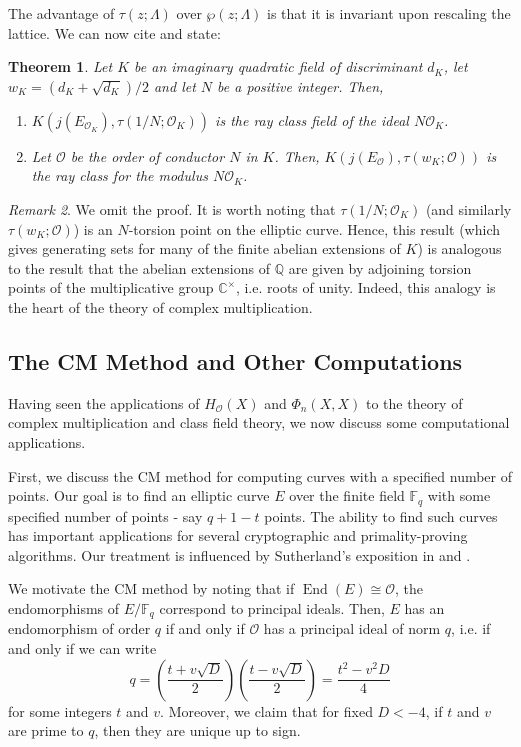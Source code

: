 \documentclass{amsart}
\newtheorem{thm}{Theorem}[section]
\theoremstyle{definition}
\theoremstyle{remark}
\newtheorem{remark}[thm]{Remark}
\numberwithin{equation}{section}
\newcommand{\cO}{\mathcal O}
\newcommand{\bbC}{\mathbb C}
\newcommand{\bbF}{\mathbb F}
\newcommand{\bbQ}{\mathbb Q}
\DeclareMathOperator{\End}{End}
\begin{document}
 The advantage of $\tau(z; \Lambda)$ over $\wp(z; \Lambda)$ is that it is invariant upon rescaling the lattice. We can now cite \cite{CoxPrimes} and state:
 
 \begin{thm} \label{thm:SecondMainTheoremOfComplexMult}
Let $K$ be an imaginary quadratic field of discriminant $d_{K}$, let $w_{K} = (d_{K} + \sqrt{d_{K}})/2$ and let $N$ be a positive integer. Then, 
\begin{enumerate}
\item $K(j(E_{\cO_{K}}), \tau(1/N; \cO_{K}))$ is the ray class field of the ideal $N \cO_{K}$.
\item Let $\cO$ be the order of conductor $N$ in $K$. Then, $K(j(E_{\cO}), \tau(w_{K};\cO))$ is the ray class for the modulus $N \cO_{K}$.
\end{enumerate}
 \end{thm}
 
 \begin{remark}
 We omit the proof. It is worth noting that $\tau(1/N;\cO_{K})$ (and similarly $\tau(w_{K};\cO)$) is an $N$-torsion point on the elliptic curve. Hence, this result (which gives generating sets for many of the finite abelian extensions of $K$) is analogous to the result that the abelian extensions of $\bbQ$ are given by adjoining torsion points of the multiplicative group $\bbC^{\times}$, i.e. roots of unity. Indeed, this analogy is the heart of the theory of complex multiplication.
 \end{remark}

\subsection{The CM Method and Other Computations} \label{subsec:CMMethod}

 Having seen the applications of $H_{\cO}(X)$ and $\Phi_{n}(X,X)$ to the theory of complex multiplication and class field theory, we now discuss some computational applications.

 First, we discuss the CM method for computing curves with a specified number of points. Our goal is to find an elliptic curve $E$ over the finite field $\bbF_{q}$ with some specified number of points - say $q + 1 - t$ points. The ability to find such curves has important applications for several cryptographic and primality-proving algorithms. Our treatment is influenced by Sutherland's exposition in \cite{SutherlandLN} and \cite{SutherlandIV}.
 
 We motivate the CM method by noting that if $\End(E) \cong \cO$, the endomorphisms of $E/\bbF_{q}$ correspond to principal ideals. Then, $E$ has an endomorphism of order $q$ if and only if $\cO$ has a principal ideal of norm $q$, i.e. if and only if we can write 
 \[
 q = \left(\frac{t + v\sqrt{D}}{2}\right) \left(\frac{t - v\sqrt{D}}{2}\right) = \frac{t^2 - v^2 D}{4}
 \]
 for some integers $t$ and $v$. Moreover, we claim that for fixed $D < -4$, if $t$ and $v$ are prime to $q$, then they are unique up to sign.
 
\end{document}
